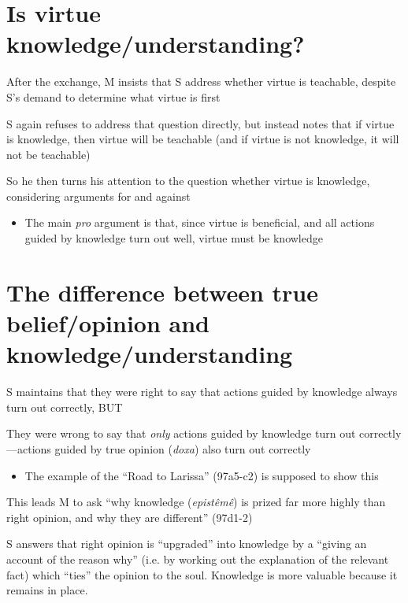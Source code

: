 \documentclass[10 pt]{article}
\begin{document}
\section*{Is virtue knowledge/understanding?}

\noindent After the exchange, M insists that S address whether virtue is teachable, despite S's demand to determine what virtue is first
\vspace*{2mm}

\noindent S again refuses to address that question directly, but instead notes that if virtue is knowledge, then virtue will be teachable (and if virtue is not knowledge, it will not be teachable)
\vspace*{2mm}

\noindent So he then turns his attention to the question whether virtue is knowledge, considering arguments for and against
\begin{itemize}\item{The main \emph{pro} argument is that, since virtue is beneficial, and all actions guided by knowledge turn out well, virtue must be knowledge}\end{itemize}

\section*{The difference between true belief/opinion and knowledge/understanding}

\noindent S maintains that they were right to say that actions guided by knowledge always turn out correctly, BUT
\vspace*{2mm}

\noindent They were wrong to say that \emph{only} actions guided by knowledge turn out correctly---actions guided by true opinion (\emph{doxa}) also turn out correctly

\begin{itemize}\item{The example of the ``Road to Larissa'' (97a5-c2) is supposed to show this}\end{itemize}

\noindent This leads M to ask ``why knowledge (\emph{epist\^{e}m\^{e}}) is prized far more highly than right opinion, and why they are different'' (97d1-2)
\vspace*{2mm}

\noindent S answers that right opinion is ``upgraded'' into knowledge by a ``giving an account of the reason why'' (i.e. by working out the explanation of the relevant fact) which ``ties'' the opinion to the soul. Knowledge is more valuable because it remains in place.
\vspace*{2mm}
\end{document}
